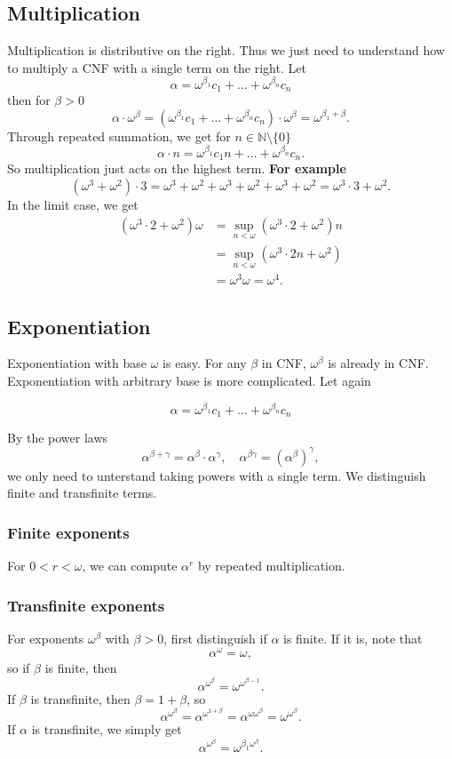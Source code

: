 \subsection{Multiplication}
Multiplication is distributive on the right. Thus we just need to understand how to multiply a CNF with a single term on the right. Let
\[ \alpha = \omega^{\beta_1}c_1 + \ldots + \omega^{\beta_n}c_n \]
then for $\beta > 0$
\[ \alpha \cdot \omega^\beta = (\omega^{\beta_1}c_1 + \ldots + \omega^{\beta_n}c_n) \cdot \omega^\beta = \omega^{\beta_1 + \beta}. \]
Through repeated summation, we get for $n \in \mathbb N \setminus \{0\}$
\[ \alpha \cdot n = \omega^{\beta_1}c_1 n + \ldots + \omega^{\beta_n}c_n. \]
So multiplication just acts on the highest term. \textbf{For example}
\[ (\omega^3 + \omega^2)\cdot 3 = \omega^3 + \omega^2 + \omega^3 + \omega^2 + \omega^3 + \omega^2 = \omega^3\cdot 3 + \omega^2. \]
In the limit case, we get
\begin{align*}
 (\omega^3 \cdot 2 + \omega^2)\omega &= \sup_{n < \omega} (\omega^3 \cdot 2 + \omega^2)n \\
 &= \sup_{n < \omega} (\omega^3 \cdot 2n + \omega^2) \\
 &= \omega^3 \omega = \omega^4.
\end{align*}

\subsection{Exponentiation}
Exponentiation with base $\omega$ is easy. For any $\beta$ in CNF, $\omega^\beta$ is already in CNF. Exponentiation with arbitrary base is more complicated. Let again

\[ \alpha = \omega^{\beta_1}c_1 + \ldots + \omega^{\beta_n}c_n \]

By the power laws
\[
 \alpha^{\beta + \gamma} = \alpha^\beta \cdot \alpha^\gamma, \quad \alpha^{\beta \gamma} = (\alpha^\beta)^\gamma, \]
we only need to unterstand taking powers with a single term. We distinguish finite and transfinite terms. 

\subsubsection{Finite exponents}
For $0 < r < \omega$, we can compute $\alpha^r$ by repeated multiplication. \\

\subsubsection{Transfinite exponents}
For exponents $\omega^\beta$ with $\beta > 0$, first distinguish if $\alpha$ is finite. If it is, note that
\[ \alpha^\omega = \omega, \]
so if $\beta$ is finite, then
\[ \alpha^{\omega^\beta} = \omega^{\omega^{\beta-1}}. \]
If $\beta$ is transfinite, then $\beta = 1 + \beta$, so
\[ \alpha^{\omega^\beta} = \alpha^{\omega^{1+\beta}} = \alpha^{\omega\omega^\beta} = \omega^{\omega^\beta}. \]
If $\alpha$ is transfinite, we simply get 
\[ \alpha^{\omega^\beta} = \omega^{\beta_1\omega^\beta}. \]

